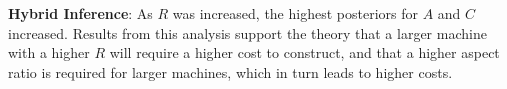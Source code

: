 \documentclass[journal]{IEEEtran}
\begin{document}
\textbf{Hybrid Inference}: As $R$ was increased, the highest posteriors for $A$ and $C$ increased. Results from this analysis support the theory that a larger machine with a higher $R$ will require a higher cost to construct, and that a higher aspect ratio is required for larger machines, which in turn leads to higher costs.




\end{document}
